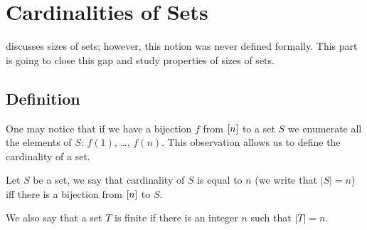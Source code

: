 \chapter{Cardinalities of Sets}
 discusses sizes of sets; however, this notion was
never defined formally. This part is going to close this gap and study
properties of sizes of sets.


\section{Definition}
One may notice that if we have a bijection $f$ from ${[{n}]}$ to a set $S$ we
enumerate all the elements of $S$: $f(1)$, \dots, $f(n)$.
This observation allows us to define the cardinality of a set.
\begin{definition}
  Let $S$ be a set, we say that cardinality of $S$ is equal to $n$ (we write
  that $|S| = n$) iff there is a bijection from ${[{n}]}$ to $S$.

  We also say that a set $T$ is finite if there is an integer $n$ such that
  $|T| = n$.
\end{definition}

